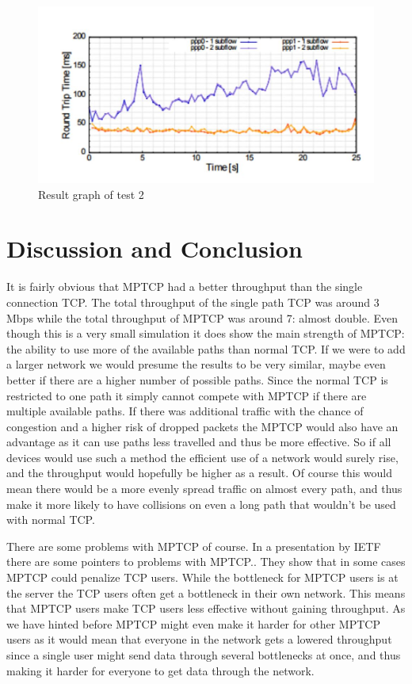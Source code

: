\documentclass[11pt,twocolumn]{article}
\begin{document}
\begin{figure}[ht]
\begin{center}
\includegraphics[scale=0.5]{graph_3}
\caption{Result graph of test 2}
\end{center}
\end{figure}


\section{Discussion and Conclusion}

It is fairly obvious that MPTCP had a better throughput than the single connection TCP. The total throughput of the single path TCP was around 3 Mbps while the total throughput of MPTCP was around 7: almost double. Even though this is a very small simulation it does show the main strength of MPTCP: the ability to use more of the available paths than normal TCP. If we were to add a larger network we would presume the results to be very similar, maybe even better if there are a higher number of possible paths. Since the normal TCP is restricted to one path it simply cannot compete with MPTCP if there are multiple available paths. If there was additional traffic with the chance of congestion and a higher risk of dropped packets the MPTCP would also have an advantage as it can use paths less travelled and thus be more effective. So if all devices would use such a method the efficient use of a network would surely rise, and the throughput would hopefully be higher as a result. Of course this would mean there would be a more evenly spread traffic on almost every path, and thus make it more likely to have collisions on even a long path that wouldn't be used with normal TCP.

There are some problems with MPTCP of course. In a presentation by IETF there are some pointers to problems with MPTCP.\cite{IETF-Probs}. They show that in some cases MPTCP could penalize TCP users. While the bottleneck for MPTCP users is at the server the TCP users often get a bottleneck in their own network. This means that MPTCP users make TCP users less effective without gaining throughput. As we have hinted before MPTCP might even make it harder for other MPTCP users as it would mean that everyone in the network gets a lowered throughput since a single user might send data through several bottlenecks at once, and thus making it harder for everyone to get data through the network.
\end{document}
